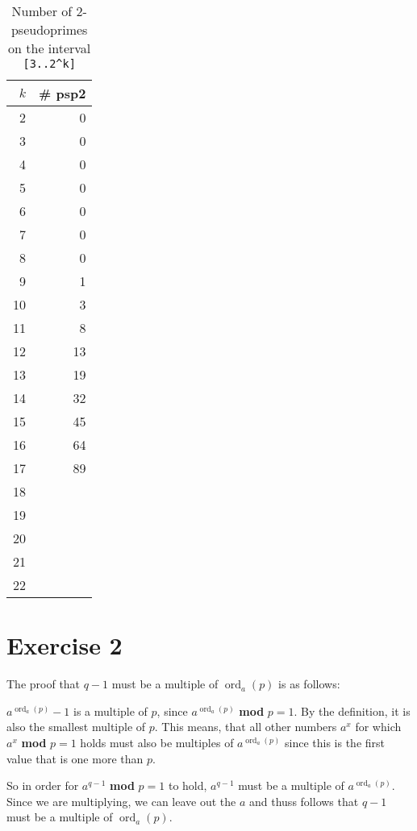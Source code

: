 \documentclass[a4paper]{article}
\DeclareMathOperator*{\ord}{ord}
\begin{document}
\begin{table}[h]
	\centering
	\caption{Number of 2-pseudoprimes on the interval \lstinline{[3..2^k]}}
	\label{tbl:exe}
	\begin{tabular}{r|r}
		$k$  & \# psp2 \\
		\hline
		2  & 0   \\
		3  & 0   \\
		4  & 0   \\
		5  & 0   \\
		6  & 0   \\
		7  & 0   \\
		8  & 0   \\
		9  & 1   \\
		10 & 3   \\
		11 & 8   \\
		12 & 13  \\
		13 & 19  \\
		14 & 32  \\
		15 & 45  \\
		16 & 64  \\
		17 & 89  \\
		18 &     \\
		19 &     \\
		20 &     \\
		21 &     \\
		22 &     \\
	\end{tabular}
\end{table}



\section*{Exercise 2}


The proof that $q-1$ must be a multiple of $\ord_a(p)$ is as follows:

$a^{\ord_a(p)} - 1$ is a multiple of $p$, since $a^{\ord_a(p)}$ \textbf{mod} $p=1$. By the definition, it is also the smallest multiple of $p$. This means, that all other numbers $a^x$ for which $a^x$ \textbf{mod} $p=1$ holds must also be multiples of $a^{\ord_a(p)}$ since this is the first value that is one more than $p$. 

So in order for $a^{q-1}$ \textbf{mod} $p=1$ to hold, $a^{q-1}$ must be a multiple of $a^{\ord_a(p)}$. Since we are multiplying, we can leave out the $a$ and thuss follows that $q-1$ must be a multiple of $\ord_a(p)$. 
\end{document}
